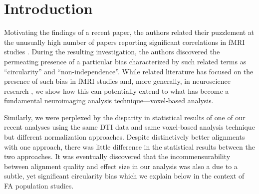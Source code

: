 \documentclass[final,5p,times,twocolumn]{elsarticle}
\begin{document}



\section{Introduction}
Motivating the findings of a recent paper, the authors related their
puzzlement at the unusually high number of papers reporting 
significant correlations in fMRI studies \cite{Vul2009}. During the 
resulting investigation, the authors discovered the permeating
presence of a particular bias characterized by such related terms as ``circularity''
and ``non-independence''.
While related literature has focused on the presence of such bias in 
fMRI studies \cite{Vul2009,Vul2010} and, more generally, in neuroscience research 
\cite{Kriegeskorte2009}, we show how this can potentially extend to what has
become a fundamental neuroimaging analysis technique---voxel-based analysis.

Similarly, we were perplexed by the disparity in statistical results of one of 
our recent analyses \cite{Stone2011} using the same DTI data and same 
voxel-based analysis technique but different normalization approaches.  Despite 
distinctively better alignments with one approach, there was little 
difference in the statistical results between the two approaches.  
It was eventually discovered that the 
incommensurability between alignment quality and effect size in our
analysis was also a due to a subtle, yet significant circularity bias
which we explain below in the context of FA population studies.  



\end{document}
